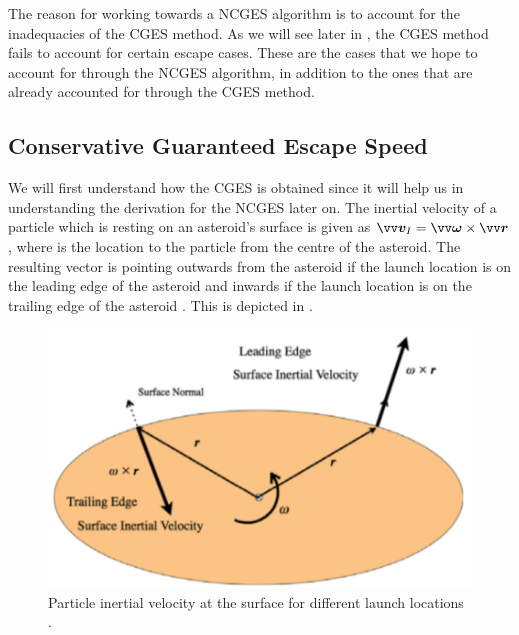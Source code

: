 %
\newline\newline
%
The reason for working towards a \gls{NCGES} algorithm is to account for the inadequacies of the \gls{CGES} method. As we will see later in , the \gls{CGES} method fails to account for certain escape cases. These are the cases that we hope to account for through the \gls{NCGES} algorithm, in addition to the ones that are already accounted for through the \gls{CGES} method.

\subsection{Conservative Guaranteed Escape Speed}
\label{subsec:conservative_escape_speed_derivation}
We will first understand how the \gls{CGES} is obtained since it will help us in understanding the derivation for the \gls{NCGES} later on. The inertial velocity of a particle which is resting on an asteroid's surface is given as $\bv{v}_I = \bv{\omega} \times \bv{r}$, where  is the location to the particle from the centre of the asteroid. The resulting vector is pointing outwards from the asteroid if the launch location is on the leading edge of the asteroid and inwards if the launch location is on the trailing edge of the asteroid \parencite{scheeresBook}. This is depicted in .
\begin{figure}[htb]
\centering
\captionsetup{justification=centering}
\includegraphics[width=\textwidth, height=0.25\textheight, keepaspectratio=true]{leading_trailing_edge.pdf}
\caption{Particle inertial velocity at the surface for different launch locations \parencite{scheeresBook}.}
\label{fig:conservative_escape_speed_leading_trailing_edges}
\end{figure}
